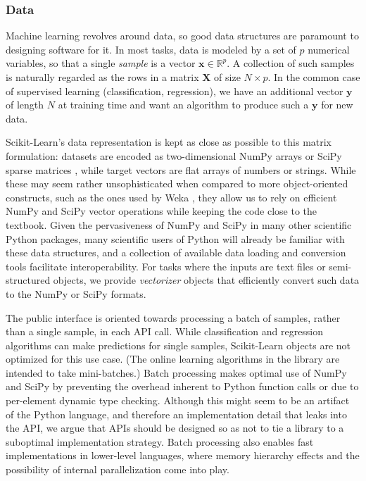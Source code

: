 \subsubsection{Data}

Machine learning revolves around data, so good data structures are paramount to
designing software for it. In most tasks, data is modeled by a set of $p$
numerical variables, so that a single \textit{sample} is a vector $\mathbf{x}
\in \mathbb{R}^p$. A collection of such samples is naturally regarded as the
rows in a matrix $\mathbf{X}$ of size $N \times p$. In the common case of
supervised learning (classification, regression), we have an additional vector
$\mathbf{y}$ of length $N$ at training time and want an algorithm to produce
such a $\mathbf{y}$ for new data.

Scikit-Learn's data representation is kept as close as possible to this matrix
formulation: datasets are encoded as two-dimensional NumPy arrays or SciPy
sparse matrices \citep{vanderwalt:2011}, while target vectors are flat
arrays of numbers or strings. While these may seem rather unsophisticated when
compared to more object-oriented constructs, such as the ones used by Weka
\citep{hall:2009}, they allow us to rely on efficient NumPy and SciPy vector
operations while keeping the code close to the textbook. Given the
pervasiveness of NumPy and SciPy in many other scientific Python packages, many
scientific users of Python will already be familiar with these data structures,
and a collection of available data loading and conversion tools facilitate
interoperability. For tasks where the inputs are text files or semi-structured
objects, we provide \textit{vectorizer} objects that efficiently convert such
data to the NumPy or SciPy formats.

The public interface is oriented towards processing a batch of samples, rather
than a single sample, in each API call. While classification and regression
algorithms can make predictions for single samples, Scikit-Learn objects are
not optimized for this use case. (The online learning algorithms in the library
are intended to take mini-batches.) Batch processing makes optimal use of NumPy
and SciPy by preventing the overhead inherent to Python function calls or due
to per-element dynamic type checking. Although this might seem to be an
artifact of the Python language, and therefore an implementation detail that
leaks into the API, we argue that APIs should be designed so as not to tie a
library to a suboptimal implementation strategy. Batch processing also enables
fast implementations in lower-level languages, where memory hierarchy effects
and the possibility of internal parallelization come into play.

